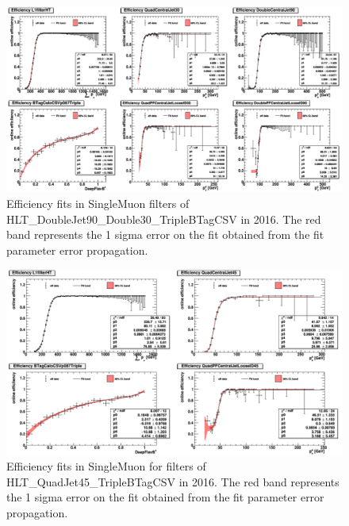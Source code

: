 \begin{figure}[htbp!]
\begin{center}
    \includegraphics[width=0.9\linewidth]{Figures/AnalysisStrategy/triggerfits/TriggerEfficiencies_2016_TTBarCut_SingleMuon_Double90Quad30_Fit_fullRange.png}
\end{center}
\caption[Efficiency fits in SingleMuon filters of HLT\_DoubleJet90\_Double30\_TripleBTagCSV in 2016]{Efficiency fits in SingleMuon filters of HLT\_DoubleJet90\_Double30\_TripleBTagCSV in 2016. The red band represents the 1 sigma error on the fit obtained from the fit parameter error propagation.}
\label{trigger:fig:SingleMuonFilterEfficiency2016DoubleFit}
\end{figure}

\begin{figure}[htbp!]
\begin{center}
    \includegraphics[width=0.9\linewidth]{Figures/AnalysisStrategy/triggerfits/TriggerEfficiencies_2016_TTBarCut_SingleMuon_Quad45_Fit_fullRange.png}
\end{center}
\caption[Efficiency fits in SingleMuon for filters of HLT\_QuadJet45\_TripleBTagCSV in 2016]{Efficiency fits in SingleMuon for filters of HLT\_QuadJet45\_TripleBTagCSV in 2016. The red band represents the 1 sigma error on the fit obtained from the fit parameter error propagation.}
\label{trigger:fig:SingleMuonFilterEfficiency2016QuadFit}
\end{figure}

